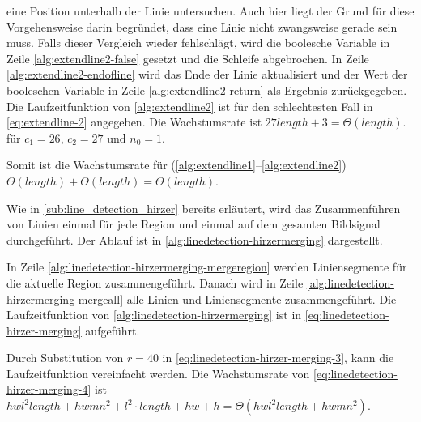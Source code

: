  eine Position unterhalb der Linie untersuchen. Auch hier liegt der Grund für diese Vorgehensweise darin begründet, dass
 eine Linie nicht zwangsweise gerade sein muss. Falls dieser Vergleich wieder fehlschlägt, wird die boolesche Variable
 in Zeile \ref{alg:extendline2-false} gesetzt und die Schleife abgebrochen. In Zeile
 \ref{alg:extendline2-endofline} wird das Ende der Linie aktualisiert und der Wert der booleschen Variable in Zeile
 \ref{alg:extendline2-return} als Ergebnis zurückgegeben. Die Laufzeitfunktion von \autoref{alg:extendline2} ist für
 den schlechtesten Fall in \autoref{eq:extendline-2} angegeben. Die Wachstumsrate ist
 $27 \mathit{length} + 3 = \Theta(\mathit{length})$. für $c_{1} = 26$, $c_{2} = 27$ und $n_{0} = 1$.

Somit ist die Wachstumsrate für  (\autoref{alg:extendline1}--\autoref{alg:extendline2})
 $\Theta(\mathit{length}) + \Theta(\mathit{length}) = \Theta(\mathit{length})$.

Wie in \autoref{sub:line_detection_hirzer} bereits erläutert, wird das Zusammenführen von Linien einmal für jede Region
 und einmal auf dem gesamten Bildsignal durchgeführt. Der Ablauf ist in \autoref{alg:linedetection-hirzermerging}
 dargestellt.

In Zeile \ref{alg:linedetection-hirzermerging-mergeregion} werden Liniensegmente für die aktuelle Region
 zusammengeführt. Danach wird in Zeile \ref{alg:linedetection-hirzermerging-mergeall} alle Linien und Liniensegmente
 zusammengeführt. Die Laufzeitfunktion von \autoref{alg:linedetection-hirzermerging} ist in
 \autoref{eq:linedetection-hirzer-merging} aufgeführt.

Durch Substitution von $r = 40$ in \autoref{eq:linedetection-hirzer-merging-3}, kann die Laufzeitfunktion vereinfacht
 werden. Die Wachstumsrate von \autoref{eq:linedetection-hirzer-merging-4} ist
$hwl^2\mathit{length} + hwmn^2 + l^2\cdot\mathit{length} + hw + h = \Theta(hwl^2\mathit{length} + hwmn^2)$.